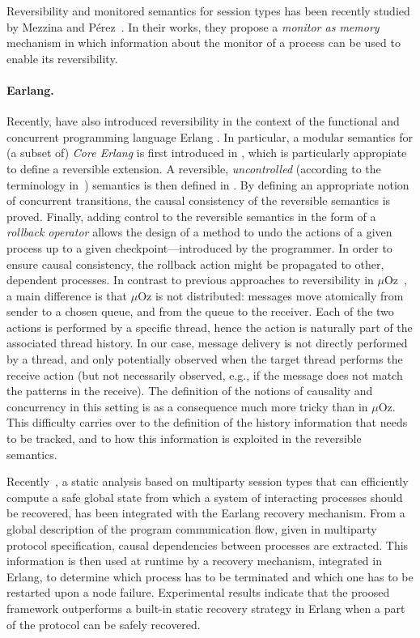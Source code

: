 \documentclass[a4paper,oneside]{article}
\begin{document}
 Reversibility and monitored semantics for session types has been recently studied by Mezzina and  P\'erez~\cite{MezzinaP16a,MezzinaP16b}. In their works, they propose a \textit{monitor as memory} mechanism in which information about the monitor of a process can be used to enable its reversibility.
 
 \paragraph{Earlang.}
Recently, \cite{NPV16,LNPV17} have also introduced reversibility in the
context of the functional and concurrent programming language Erlang
\cite{AVW96}. In particular, a modular semantics for (a subset of)
\emph{Core Erlang} \cite{CGJLNPV04} is first introduced in
\cite{NPV16}, which is particularly appropiate to define a reversible
extension. A reversible, \emph{uncontrolled} (according to the
terminology in~\cite{LMT14}) semantics is then defined in
\cite{LNPV17}. By defining an appropriate notion of concurrent
transitions, the causal consistency of the reversible semantics is
proved. Finally, adding control to the reversible semantics in the
form of a \emph{rollback operator} allows the design of a method to
undo the actions of a given process up to a given
checkpoint---introduced by the programmer. In order to ensure
causal consistency, the rollback action might be propagated to other,
dependent processes.
%
In contrast to previous approaches to reversibility in
$\mu$Oz~\cite{LLMS12,GLM14}, a main difference is that $\mu$Oz is not
distributed: messages move atomically from sender to a chosen queue,
and from the queue to the receiver. Each of the two actions is
performed by a specific thread, hence the action is naturally part of
the associated thread history. In our case, message delivery is not
directly performed by a thread, and only potentially observed when the
target thread performs the receive action (but not necessarily
observed, e.g., if the message does not match the patterns in the
receive). The definition of the notions of causality and concurrency
in this setting is as a consequence much more tricky than in
$\mu$Oz. This difficulty carries over to the definition of the history
information that needs to be tracked, and to how this information is
exploited in the reversible semantics.

Recently~\cite{NY2017}, 
a static analysis based on multiparty session types that
 can efficiently compute a safe global state from which a system of interacting processes should be recovered, has been integrated with the Earlang recovery mechanism. From a global description of the program communication flow, given in multiparty protocol specification, 
  causal dependencies between processes are extracted. This information is then used at runtime by a recovery mechanism, integrated in Erlang, to determine which process has to be terminated and which one has to be restarted upon a node failure. Experimental results indicate that the proosed framework outperforms a built-in static recovery strategy in Erlang when a part of the protocol can be safely recovered. 
  
  


\end{document}
